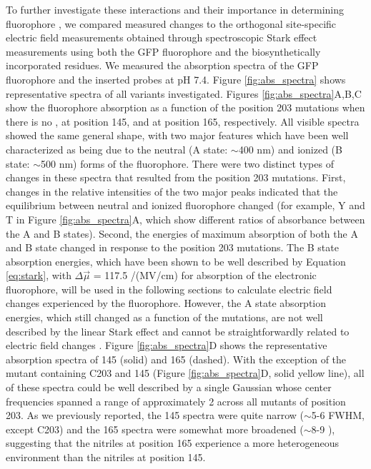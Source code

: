 To further investigate these interactions and their importance in determining fluorophore \pKa{}, we compared measured \pKa{} changes to the orthogonal site-specific electric field measurements obtained through spectroscopic Stark effect measurements using both the GFP fluorophore and the biosynthetically incorporated \pCNF{} residues.
We measured the absorption spectra of the GFP fluorophore and the inserted \pCNF{} probes at pH 7.4.
Figure \ref{fig:abs_spectra} shows representative spectra of all variants investigated.
Figures \ref{fig:abs_spectra}A,B,C show the fluorophore absorption as a function of the position 203 mutations when there is no \pCNF{}, \pCNF{} at position 145, and \pCNF{} at position 165, respectively.
All visible spectra showed the same general shape, with two major features which have been well characterized as being due to the neutral (A state: $\sim$400 \si{\nm}) and ionized (B state: $\sim$500 \si{\nm}) forms of the fluorophore.
There were two distinct types of changes in these spectra that resulted from the position 203 mutations.
First, changes in the relative intensities of the two major peaks indicated that the equilibrium between neutral and ionized fluorophore changed (for example, Y and T in Figure \ref{fig:abs_spectra}A, which show different ratios of absorbance between the A and B states).
Second, the energies of maximum absorption of both the A and B state changed in response to the position 203 mutations.
The B state absorption energies, which have been shown to be well described by Equation \ref{eq:stark}, with $\Delta\vec{\mu}$ = 117.5 \si{\wn}/(MV/cm)\cite{Bublitz1998} for absorption of the electronic fluorophore, will be used in the following sections to calculate electric field changes experienced by the fluorophore.
However, the A state absorption energies, which still changed as a function of the mutations, are not well described by the linear Stark effect and cannot be straightforwardly related to electric field changes \cite{Bublitz1998}.
Figure \ref{fig:abs_spectra}D shows the representative \pCNF{} absorption spectra of \pCNF{} 145 (solid) and 165 (dashed).
With the exception of the mutant containing C203 and \pCNF{} 145 (Figure \ref{fig:abs_spectra}D, solid yellow line), all of these spectra could be well described by a single Gaussian whose center frequencies spanned a range of approximately 2 \si{\wn} across all mutants of position 203.
As we previously reported, the \pCNF{} 145 spectra were quite narrow ($\sim$5-6 \si{\wn} FWHM, except C203) and the \pCNF{} 165 spectra were somewhat more broadened ($\sim$8-9 \si{\wn}), suggesting that the nitriles at position 165 experience a more heterogeneous environment than the nitriles at position 145.
